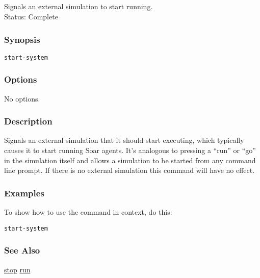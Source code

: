 \subsection{}
\label{start-system}
Signals an external simulation to start running. \\ 
Status: Complete 
\subsubsection*{Synopsis}
\begin{verbatim}
start-system
\end{verbatim}
\subsubsection*{Options}
 No options. 
\subsubsection*{Description}
 Signals an external simulation that it should start executing, which typically causes it to start running Soar agents. It's analogous to pressing a ``run'' or ``go'' in the simulation itself and allows a simulation to be started from any command line prompt. If there is no external simulation this command will have no effect. 
\subsubsection*{Examples}
 To show how to use the command in context, do this: \begin{verbatim}
start-system
\end{verbatim}
\subsubsection*{See Also}
\hyperref[stop]{stop} \hyperref[run]{run} 